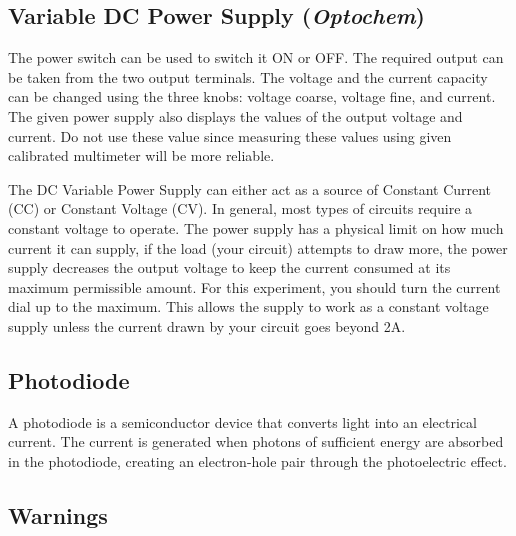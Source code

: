 \subsection*{Variable DC Power Supply (\textit{Optochem})}

The power switch can be used to switch it ON or OFF. The required output can be taken from the two output terminals. The voltage and the current capacity can be changed using the three knobs: voltage coarse, voltage fine, and current. The given power supply also displays the values of the output voltage and current. Do not use these value since measuring these values using given calibrated multimeter will be more reliable. 

The DC Variable Power Supply can either act as a source of Constant Current (CC) or Constant Voltage (CV). In general, most types of circuits require a constant voltage to operate. The power supply has a physical limit on how much current it can supply, if the load (your circuit) attempts to draw more, the power supply decreases the output voltage to keep the current consumed at its maximum permissible amount. For this experiment, you should turn the current dial up to the maximum. This allows the supply to work as a constant voltage supply unless the current drawn by your circuit goes beyond 2A.

\subsection*{Photodiode}

A photodiode is a semiconductor device that converts light into an electrical current. The current is generated when photons of sufficient energy are absorbed in the photodiode, creating an electron-hole pair through the photoelectric effect.

\subsection*{Warnings}

